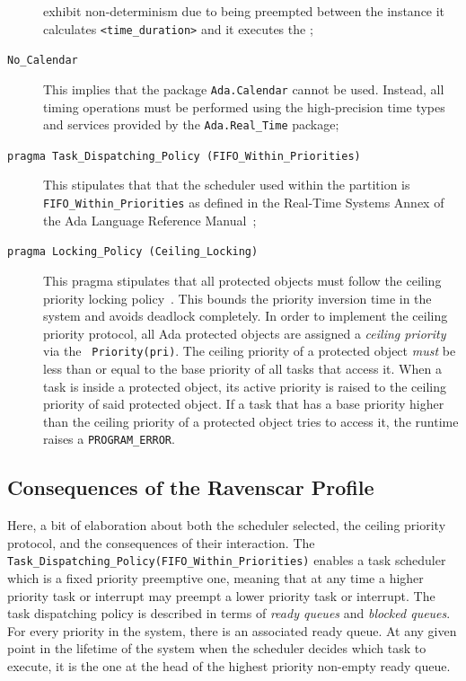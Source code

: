 \begin{description}
{  exhibit non-determinism due to being preempted between the instance
  it calculates \texttt{<time\_duration>} and it executes the
  ;}
\item[\texttt{No\_Calendar}]{This implies that the package
  \texttt{Ada.Calendar} cannot be used. Instead, all timing operations
  must be performed using the high-precision time types and services
  provided by the \texttt{Ada.Real\_Time} package;}
\item[\texttt{pragma Task\_Dispatching\_Policy
    (FIFO\_Within\_Priorities)}]{This stipulates that that the
  scheduler used within the partition is
  \texttt{FIFO\_Within\_Priorities} as defined in the Real-Time
  Systems Annex of the Ada Language Reference Manual~\cite{arm95,
    arm05};}
\item[\texttt{pragma Locking\_Policy (Ceiling\_Locking)}]{This pragma
  stipulates that all protected objects must follow the ceiling
  priority locking policy~\cite{sha@toc90}. This bounds the priority
  inversion time in the system and avoids deadlock completely. In
  order to implement the ceiling priority protocol, all Ada protected
  objects are assigned a \emph{ceiling priority} via the
  \texttt{ Priority(pri)}. The ceiling priority of a
  protected object \emph{must} be less than or equal to the base
  priority of all tasks that access it. When a task is inside a
  protected object, its active priority is raised to the ceiling
  priority of said protected object. If a task that has a base
  priority higher than the ceiling priority of a protected object
  tries to access it, the runtime raises a \texttt{PROGRAM\_ERROR}.}
\end{description}

\subsection{Consequences of the Ravenscar Profile}
Here, a bit of elaboration about both the scheduler selected, the
ceiling priority protocol, and the consequences of their
interaction. The 
\texttt{Task\_Dispatching\_Policy(FIFO\_Within\_Priorities)} enables a
task scheduler which is a fixed priority preemptive one, meaning that
at any time a higher priority task or interrupt may preempt a lower
priority task or interrupt. The task dispatching policy is described
in terms of \emph{ready queues} and \emph{blocked queues}. For every
priority in the system, there is an associated ready queue. At any
given point in the lifetime of the system when the scheduler decides
which task to execute, it is the one at the head of the highest
priority non-empty ready queue.

